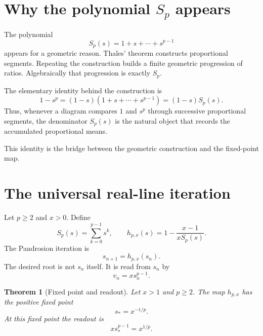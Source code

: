 \documentclass[11pt,a4paper]{article}
\theoremstyle{plain}
\newtheorem{theorem}{Theorem}[section]
\theoremstyle{definition}
\theoremstyle{remark}
\newcommand{\Sp}{S_p}
\newcommand{\hp}{h_{p,x}}
\begin{document}
\section{Why the polynomial \texorpdfstring{$S_p$}{Sp} appears}
\label{sec:geometry}

The polynomial
\[
  \Sp(s)=1+s+\cdots+s^{p-1}
\]
appears for a geometric reason.  Thales' theorem constructs proportional
segments.  Repeating the construction builds a finite geometric progression of
ratios.  Algebraically that progression is exactly $\Sp$.

The elementary identity behind the construction is
\begin{equation}
  1-s^p=(1-s)(1+s+\cdots+s^{p-1})=(1-s)\Sp(s).
  \label{eq:telescopic-Sp}
\end{equation}
Thus, whenever a diagram compares $1$ and $s^p$ through successive proportional
segments, the denominator $\Sp(s)$ is the natural object that records the
accumulated proportional means.

This identity is the bridge between the geometric construction and the
fixed-point map.

\section{The universal real-line iteration}
\label{sec:general}

Let $p\ge 2$ and $x>0$.  Define
\begin{equation}
  \Sp(s)=\sum_{k=0}^{p-1}s^k,
  \qquad
  \hp(s)=1-\frac{x-1}{x\Sp(s)}.
  \label{eq:hp-def}
\end{equation}
The Pandrosion iteration is
\begin{equation}
  s_{n+1}=\hp(s_n).
  \label{eq:pandrosion-iteration}
\end{equation}
The desired root is not $s_n$ itself.  It is read from $s_n$ by
\begin{equation}
  v_n=x s_n^{p-1}.
  \label{eq:readout}
\end{equation}

\begin{theorem}[Fixed point and readout]
\label{thm:fixed-point}
Let $x>1$ and $p\ge 2$.  The map $\hp$ has the positive fixed point
\[
  s_*=x^{-1/p}.
\]
At this fixed point the readout is
\[
  x s_*^{p-1}=x^{1/p}.
\]
\end{theorem}
\end{document}
